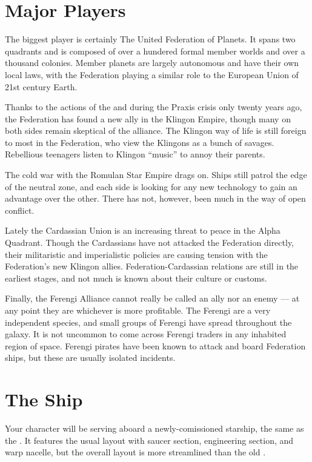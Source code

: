 \documentclass[12pt]{article}
\begin{document}
\section{Major Players}
The biggest player is certainly The United Federation of Planets. It spans two
quadrants and is composed of over a hundered formal member worlds and over a
thousand colonies. Member planets are largely autonomous and have their own
local laws, with the Federation playing a similar role to the European Union of
21st century Earth.

Thanks to the actions of the  and 
during the Praxis crisis only twenty years ago, the Federation has found a new
ally in the Klingon Empire, though many on both sides remain skeptical of the
alliance. The Klingon way of life is still foreign to most in the Federation,
who view the Klingons as a bunch of savages. Rebellious teenagers listen to
Klingon ``music'' to annoy their parents.

The cold war with the Romulan Star Empire drags on. Ships still patrol the edge
of the neutral zone, and each side is looking for any new technology to gain an
advantage over the other. There has not, however, been much in the way of open
conflict.

Lately the Cardassian Union is an increasing threat to peace in the Alpha
Quadrant. Though the Cardassians have not attacked the Federation directly,
their militaristic and imperialistic policies are causing tension with the
Federation's new Klingon allies. Federation-Cardassian relations are still in
the earliest stages, and not much is known about their culture or customs.

Finally, the Ferengi Alliance cannot really be called an ally nor an enemy ---
at any point they are whichever is more profitable. The Ferengi are a very
independent species, and small groups of Ferengi have spread throughout the
galaxy. It is not uncommon to come across Ferengi traders in any inhabited
region of space. Ferengi pirates have been known to attack and board Federation
ships, but these are usually isolated incidents.

\section{The Ship}

Your character will be serving aboard a newly-comissioned 
starship, the same as the . It features the usual
layout with saucer section, engineering section, and warp nacelle, but the
overall layout is more streamlined than the old .
\end{document}
